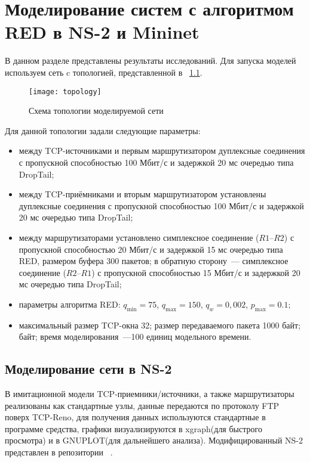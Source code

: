 
\chapter{Моделирование систем с алгоритмом RED в NS-2 и Mininet}
\label{chap3}

В данном разделе представлены результаты исследований. Для запуска моделей используем сеть c топологией, представленной в ~\ref{ch3:fig1}.
 
\begin{figure}[h!]
 \centerline{\texttt{[image: topology]}}
 \caption{Схема топологии моделируемой сети}
\label{ch3:fig1}
\end{figure}

Для данной топологии задали следующие параметры:

\begin{itemize}
\item между TCP-источниками и первым маршрутизатором дуплексные соединения 
	с пропускной способностью 100 Мбит/с и
  	задержкой 20 мс очередью типа DropTail;
\item между TCP-приёмниками и вторым маршрутизатором установлены
  	дуплексные соединения с пропускной способностью 100 Мбит/с и
  	задержкой 20 мс очередью типа DropTail;
\item между маршрутизаторами установлено симплексное соединение
  	($R1$--$R2$) с пропускной способностью 20 Мбит/с и задержкой 15 мс
  	очередью типа RED, размером буфера 300 пакетов; в обратную сторону~---
  	симплексное соединение ($R2$--$R1$) с пропускной способностью 15 Мбит/с и
  	задержкой 20 мс очередью типа DropTail;
\item параметры алгоритма RED: $q_{\min}=75$, $q_{\max}=150$, $q_w=0,002$, $p_{\max}=0.1$;
\item максимальный размер TCP-окна 32; размер передаваемого пакета 1000 байт;
  	байт; время моделирования~---100 единиц модельного времени.
\end{itemize}

\section{Моделирование сети в NS-2}
\label{chap3:sec1}

В имитационной модели TCP-приемники/источники, а также маршрутизаторы реализованы как стандартные узлы, данные передаются по протоколу FTP поверх TCP-Reno, 
для получения данных используются стандартные в программе средства, графики визуализируются в xgraph(для быстрого просмотра) и в GNUPLOT(для дальнейшего анализа).
Модифицированный NS-2 представлен в репозитории ~\cite{ns2-with-red}.

